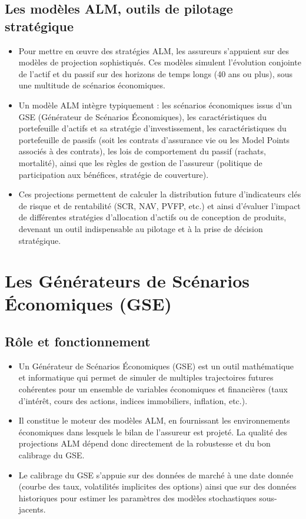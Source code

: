 \subsection{Les modèles ALM, outils de pilotage stratégique}
\begin{itemize}
    \item Pour mettre en œuvre des stratégies ALM, les assureurs s'appuient sur des modèles de projection sophistiqués. Ces modèles simulent l'évolution conjointe de l'actif et du passif sur des horizons de temps longs (40 ans ou plus), sous une multitude de scénarios économiques. \newline{}
    \item Un modèle ALM intègre typiquement : les scénarios économiques issus d'un GSE (Générateur de Scénarios Économiques), les caractéristiques du portefeuille d'actifs et sa stratégie d'investissement, les caractéristiques du portefeuille de passifs (soit les contrats d'assurance vie ou les Model Points associés à des contrats), les lois de comportement du passif (rachats, mortalité), ainsi que les règles de gestion de l'assureur (politique de participation aux bénéfices, stratégie de couverture). \newline{}
    \item Ces projections permettent de calculer la distribution future d'indicateurs clés de risque et de rentabilité (SCR, NAV, PVFP, etc.) et ainsi d'évaluer l'impact de différentes stratégies d'allocation d'actifs ou de conception de produits, devenant un outil indispensable au pilotage et à la prise de décision stratégique.
\end{itemize}


\section{Les Générateurs de Scénarios Économiques (GSE)}
\label{sec:gse}

\subsection{Rôle et fonctionnement}
\begin{itemize}
    \item Un Générateur de Scénarios Économiques (GSE) est un outil mathématique et informatique qui permet de simuler de multiples trajectoires futures cohérentes pour un ensemble de variables économiques et financières (taux d'intérêt, cours des actions, indices immobiliers, inflation, etc.). \newline{}
    \item Il constitue le moteur des modèles ALM, en fournissant les environnements économiques dans lesquels le bilan de l'assureur est projeté. La qualité des projections ALM dépend donc directement de la robustesse et du bon calibrage du GSE. \newline{}
    \item Le calibrage du GSE s'appuie sur des données de marché à une date donnée (courbe des taux, volatilités implicites des options) ainsi que sur des données historiques pour estimer les paramètres des modèles stochastiques sous-jacents.
\end{itemize}

